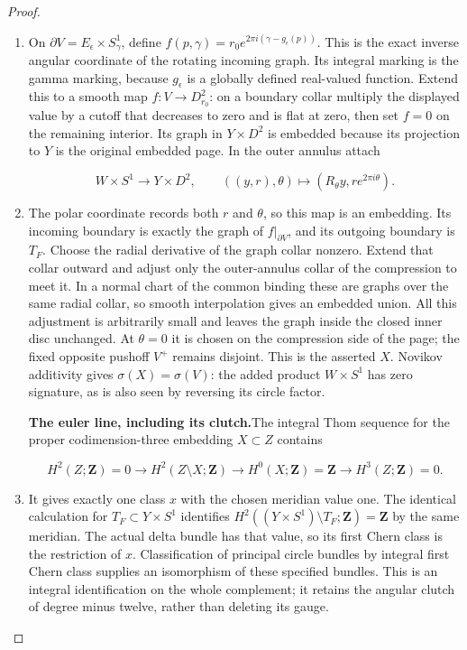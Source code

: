 \begin{proof}
\begin{enumerate}[label=\arabic*.]
\item On \(\partial V=E_\epsilon\times S^1_\gamma\), define
\(f(p,\gamma)=r_0e^{2\pi i(\gamma-g_\epsilon(p))}\).
This is the exact inverse angular coordinate of the rotating
incoming graph.  Its integral marking is the gamma marking,
because \(g_\epsilon\) is a globally defined real-valued function.
Extend this to a smooth map
\(f:V\to D^2_{r_0}\): on a boundary collar multiply the displayed
value by a cutoff that decreases to zero and is flat at zero,
then set \(f=0\) on the remaining interior.  Its graph in
\(Y\times D^2\) is embedded because its projection to \(Y\) is the
original embedded page.  In the outer annulus attach

\[
 W\times S^1\longrightarrow Y\times D^2,
 \qquad ((y,r),\theta)\longmapsto
 (R_\theta y,r e^{2\pi i\theta}).
\]

\item The polar coordinate records both \(r\) and \(\theta\), so this
map is an embedding.  Its incoming boundary is exactly the graph
of \(f|_{\partial V}\), and its outgoing boundary is \(T_F\).
Choose the radial derivative of the graph collar nonzero.  Extend
that collar outward and adjust only the outer-annulus collar of
the compression to meet it.  In a normal chart of the common
binding these are graphs over the same radial collar, so smooth
interpolation gives an embedded union.  All this adjustment is
arbitrarily small and leaves the graph inside the closed inner
disc unchanged.  At \(\theta=0\) it is chosen on the compression
side of the page; the fixed opposite pushoff \(V^+\) remains
disjoint.  This is the asserted \(X\).  Novikov additivity gives
\(\sigma(X)=\sigma(V)\): the added product \(W\times S^1\) has zero
signature, as is also seen by reversing its circle factor.

\par\medskip\noindent\textbf{The euler line, including its clutch.}\enspace The integral Thom
sequence for the proper codimension-three embedding \(X\subset Z\)
contains

\[
 H^2(Z;\mathbf Z)=0\longrightarrow H^2(Z\setminus X;\mathbf Z)
 \longrightarrow H^0(X;\mathbf Z)=\mathbf Z
 \longrightarrow H^3(Z;\mathbf Z)=0.
\]

\item It gives exactly one class \(x\) with the chosen meridian value one.
The identical calculation for
\(T_F\subset Y\times S^1\) identifies
\(H^2((Y\times S^1)\setminus T_F;\mathbf Z)=\mathbf Z\)
by the same meridian.  The actual delta bundle has that value,
so its first Chern class is the restriction of \(x\).  Classification
of principal circle bundles by integral first Chern class supplies
an isomorphism of these specified bundles.  This is an integral
identification on the whole complement; it retains the angular
clutch of degree minus twelve, rather than deleting its gauge.


\end{enumerate}
\end{proof}
